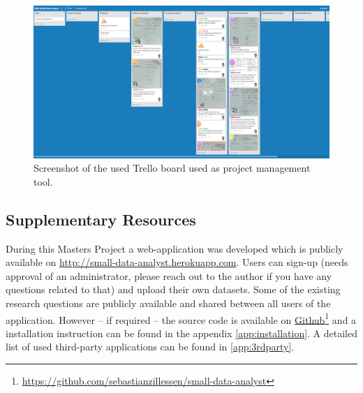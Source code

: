 \begin{figure}[h]
\centering
	\includegraphics[page=1,width=\textwidth]{figures/trello}
\caption{Screenshot of the used Trello board used as project management tool.}
\label{fig:trello}
\end{figure}

\subsection{Supplementary Resources}

During this Masters Project a web-application was developed which is publicly available on \href{http://small-data-analyst.herokuapp.com}{http://small-data-analyst.herokuapp.com}. Users can sign-up (needs approval of an administrator, please reach out to the author if you have any questions related to that) and upload their own datasets. Some of the existing research questions are publicly available and shared between all users of the application. However -- if required -- the source code is available on \href{https://github.com/sebastianzillessen/small-data-analyst}{Github}\footnote{\href{https://github.com/sebastianzillessen/small-data-analyst}{https://github.com/sebastianzillessen/small-data-analyst}} and a installation instruction can be found in the appendix \autoref{app:installation}. A detailed list of used third-party applications can be found in \autoref{app:3rdparty}.

